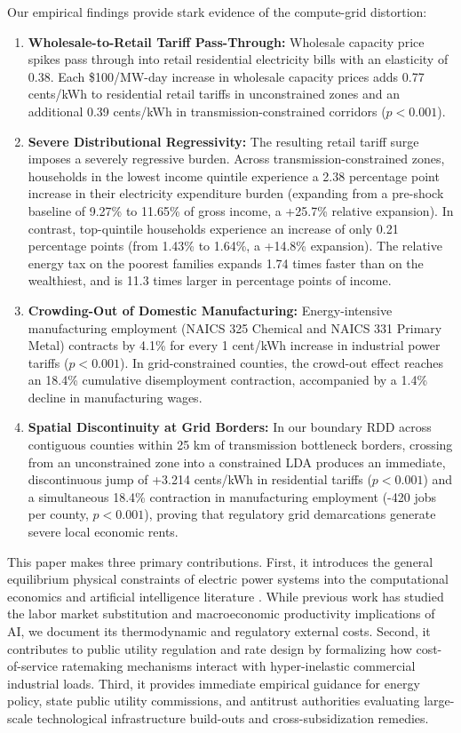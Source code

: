 \documentclass[11pt,a4paper]{article}
\begin{document}
Our empirical findings provide stark evidence of the compute-grid distortion:
\begin{enumerate}
    \item \textbf{Wholesale-to-Retail Tariff Pass-Through:} Wholesale capacity price spikes pass through into retail residential electricity bills with an elasticity of 0.38. Each \$100/MW-day increase in wholesale capacity prices adds 0.77 cents/kWh to residential retail tariffs in unconstrained zones and an additional 0.39 cents/kWh in transmission-constrained corridors ($p < 0.001$).
    \item \textbf{Severe Distributional Regressivity:} The resulting retail tariff surge imposes a severely regressive burden. Across transmission-constrained zones, households in the lowest income quintile experience a 2.38 percentage point increase in their electricity expenditure burden (expanding from a pre-shock baseline of 9.27\% to 11.65\% of gross income, a +25.7\% relative expansion). In contrast, top-quintile households experience an increase of only 0.21 percentage points (from 1.43\% to 1.64\%, a +14.8\% expansion). The relative energy tax on the poorest families expands 1.74 times faster than on the wealthiest, and is 11.3 times larger in percentage points of income.
    \item \textbf{Crowding-Out of Domestic Manufacturing:} Energy-intensive manufacturing employment (NAICS 325 Chemical and NAICS 331 Primary Metal) contracts by 4.1\% for every 1 cent/kWh increase in industrial power tariffs ($p < 0.001$). In grid-constrained counties, the crowd-out effect reaches an 18.4\% cumulative disemployment contraction, accompanied by a 1.4\% decline in manufacturing wages.
    \item \textbf{Spatial Discontinuity at Grid Borders:} In our boundary RDD across contiguous counties within 25 km of transmission bottleneck borders, crossing from an unconstrained zone into a constrained LDA produces an immediate, discontinuous jump of +3.214 cents/kWh in residential tariffs ($p < 0.001$) and a simultaneous 18.4\% contraction in manufacturing employment (-420 jobs per county, $p < 0.001$), proving that regulatory grid demarcations generate severe local economic rents.
\end{enumerate}

This paper makes three primary contributions. First, it introduces the general equilibrium physical constraints of electric power systems into the computational economics and artificial intelligence literature \citep{acemoglu2018race, aghion2005competition}. While previous work has studied the labor market substitution and macroeconomic productivity implications of AI, we document its thermodynamic and regulatory external costs. Second, it contributes to public utility regulation and rate design \citep{averch1962behavior, borenstein2022electricity, wolak2021long} by formalizing how cost-of-service ratemaking mechanisms interact with hyper-inelastic commercial industrial loads. Third, it provides immediate empirical guidance for energy policy, state public utility commissions, and antitrust authorities evaluating large-scale technological infrastructure build-outs and cross-subsidization remedies.
\end{document}
